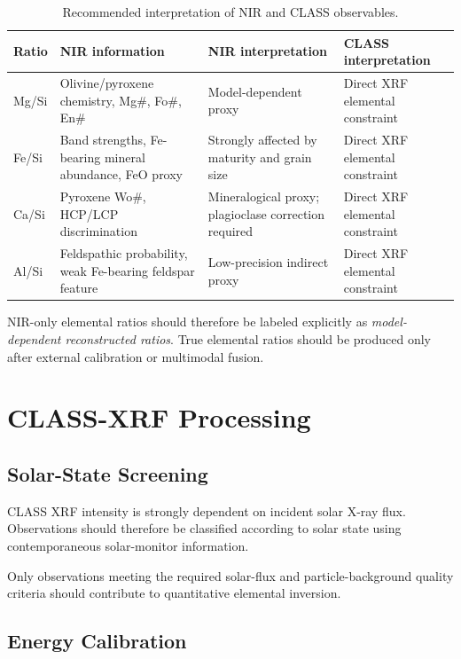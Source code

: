 \documentclass[11pt,a4paper]{article}
\begin{document}
\begin{table}[H]
\centering
\caption{Recommended interpretation of NIR and CLASS observables.}
\begin{tabular}{p{}p{}p{}p{}}
\toprule
Ratio & NIR information & NIR interpretation & CLASS interpretation \\
\midrule
Mg/Si & Olivine/pyroxene chemistry, Mg\#, Fo\#, En\# & Model-dependent proxy & Direct XRF elemental constraint \\
Fe/Si & Band strengths, Fe-bearing mineral abundance, FeO proxy & Strongly affected by maturity and grain size & Direct XRF elemental constraint \\
Ca/Si & Pyroxene Wo\#, HCP/LCP discrimination & Mineralogical proxy; plagioclase correction required & Direct XRF elemental constraint \\
Al/Si & Feldspathic probability, weak Fe-bearing feldspar feature & Low-precision indirect proxy & Direct XRF elemental constraint \\
\bottomrule
\end{tabular}
\end{table}

NIR-only elemental ratios should therefore be labeled explicitly as \emph{model-dependent reconstructed ratios}. True elemental ratios should be produced only after external calibration or multimodal fusion.

\section{CLASS-XRF Processing}

\subsection{Solar-State Screening}

CLASS XRF intensity is strongly dependent on incident solar X-ray flux. Observations should therefore be classified according to solar state using contemporaneous solar-monitor information.

Only observations meeting the required solar-flux and particle-background quality criteria should contribute to quantitative elemental inversion.

\subsection{Energy Calibration}
\end{document}
